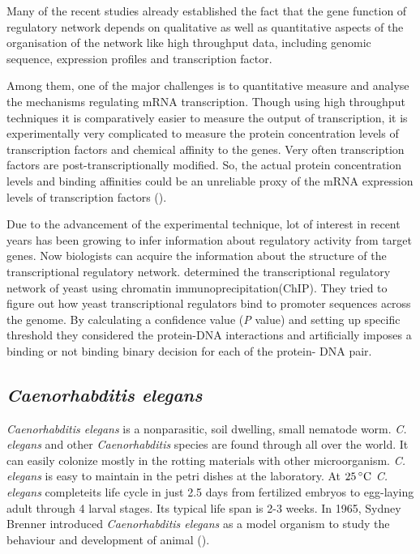 Many of the recent studies already established the fact that the gene function of regulatory network depends on qualitative as well as quantitative aspects of the organisation of the network like high throughput data, including genomic sequence, expression profiles and transcription factor.

Among them, one of the major challenges is to quantitative measure and analyse the mechanisms regulating mRNA transcription. Though using high throughput techniques it is comparatively easier to measure the output of transcription, it is experimentally very complicated to measure the protein concentration levels of transcription factors and chemical affinity to the genes. Very often transcription factors are post-transcriptionally modified. So, the actual protein concentration levels and binding affinities could be an unreliable proxy of the mRNA expression levels of transcription factors (\cite{Sanguinetti:2006}).

Due to the advancement of the experimental technique, lot of interest in recent years has been growing to infer information about regulatory activity from target genes. Now biologists can acquire the information about the structure of the transcriptional regulatory network. \cite{Lee:2002} determined the transcriptional regulatory network of yeast using chromatin immunoprecipitation(ChIP). They tried to figure out how yeast transcriptional regulators bind to promoter sequences across the genome. By calculating a confidence value (\textit{P} value) and setting up specific threshold they considered the protein-DNA interactions and artificially imposes a binding or not binding binary decision for each of the protein- DNA pair.

\subsection{\textit{Caenorhabditis elegans}}
\textit{Caenorhabditis elegans} is a nonparasitic, soil dwelling, small nematode worm. \textit{C. elegans} and other \textit{Caenorhabditis} species are found through all over the world. It can easily colonize mostly in the rotting materials with other microorganism. \textit{C. elegans} is easy to maintain in the petri dishes at the laboratory. At $25\,^{\circ}{\rm C}$ \textit{C. elegans} completeits life cycle in just 2.5 days from fertilized embryos to egg-laying adult through 4 larval stages. Its typical life span is 2-3 weeks. In 1965, Sydney Brenner introduced \textit{Caenorhabditis elegans} as a model organism to study the behaviour and development of animal (\cite{Brenner:1974}).

